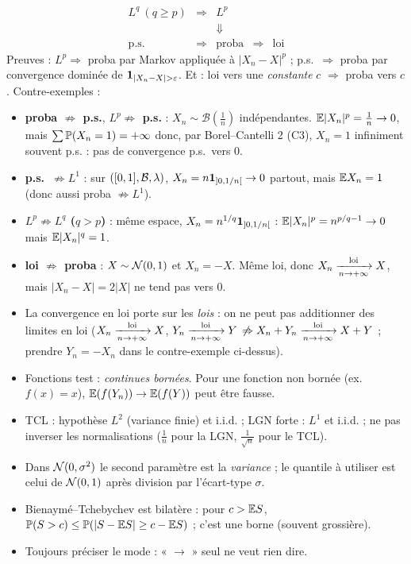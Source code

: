 \documentclass[11pt,a4paper]{article}
\begin{document}
\begin{liens}[title={Liens entre modes de convergence (hors cours)}]
\[\begin{array}{ccccc}
L^q\ (q\ge p) & \Rightarrow & L^p & & \\
 & & \Downarrow & & \\
\text{p.s.} & \Rightarrow & \text{proba} & \Rightarrow & \text{loi}
\end{array}\]
Preuves : $L^p\Rightarrow$ proba par Markov appliquée à $|X_n-X|^p$ ; p.s.\ $\Rightarrow$ proba par convergence dominée de
$\1_{|X_n-X|>\varepsilon}$. Et : loi vers une \emph{constante} $c$ $\Rightarrow$ proba vers $c$. Contre-exemples :
\begin{itemize}
  \item \textbf{proba $\not\Rightarrow$ p.s.}, \textbf{$L^p\not\Rightarrow$ p.s.} : $X_n\sim\mathcal B(\frac1n)$ indépendantes. $\mathbb{E}|X_n|^p=\frac1n\to0$,
  mais $\sum\mathbb{P}(X_n=1)=+\infty$ donc, par Borel--Cantelli 2 (C3), $X_n=1$ infiniment souvent p.s. : pas de convergence p.s.\ vers 0.
  \item \textbf{p.s.\ $\not\Rightarrow L^1$} : sur $([0,1],\mathcal{B},\lambda)$, $X_n=n\mathbf{1}_{]0,1/n[}\to0$ partout, mais $\mathbb{E} X_n=1$ (donc aussi proba $\not\Rightarrow L^1$).
  \item \textbf{$L^p\not\Rightarrow L^q$ ($q>p$)} : même espace, $X_n=n^{1/q}\mathbf{1}_{]0,1/n[}$ : $\mathbb{E}|X_n|^p=n^{p/q-1}\to0$ mais $\mathbb{E}|X_n|^q=1$.
  \item \textbf{loi $\not\Rightarrow$ proba} : $X\sim\mathcal{N}(0,1)$ et $X_n=-X$. Même loi, donc $X_n\xrightarrow[n\to+\infty]{\text{loi}} X$, mais $|X_n-X|=2|X|$ ne tend pas vers 0.
\end{itemize}
\end{liens}

\begin{piege}
\begin{itemize}
  \item La convergence en loi porte sur les \emph{lois} : on ne peut pas additionner des limites en loi
  ($X_n\xrightarrow[n\to+\infty]{\text{loi}} X$, $Y_n\xrightarrow[n\to+\infty]{\text{loi}} Y$ $\not\Rightarrow X_n+Y_n\xrightarrow[n\to+\infty]{\text{loi}} X+Y$ ; prendre $Y_n=-X_n$ dans le contre-exemple ci-dessus).
  \item Fonctions test : \emph{continues bornées}. Pour une fonction non bornée (ex.\ $f(x)=x$), $\mathbb{E}(f(Y_n))\to\mathbb{E}(f(Y))$ peut être fausse.
  \item TCL : hypothèse $L^2$ (variance finie) et i.i.d. ; LGN forte : $L^1$ et i.i.d. ; ne pas inverser les normalisations
  ($\frac1n$ pour la LGN, $\frac1{\sqrt n}$ pour le TCL).
  \item Dans $\mathcal{N}(0,\sigma^2)$ le second paramètre est la \emph{variance} ; le quantile à utiliser est celui de $\mathcal{N}(0,1)$ après
  division par l'écart-type $\sigma$.
  \item Bienaymé--Tchebychev est bilatère : pour $c>\mathbb{E} S$, $\mathbb{P}(S>c)\le\mathbb{P}(|S-\mathbb{E} S|\ge c-\mathbb{E} S)$ ; c'est une borne (souvent grossière).
  \item Toujours préciser le mode : « $\to$ » seul ne veut rien dire.
\end{itemize}
\end{piege}
\end{document}

